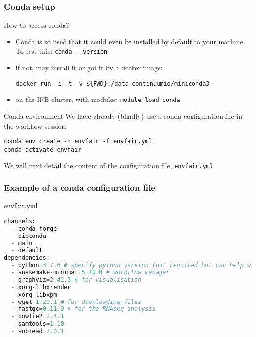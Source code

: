 \begin{frame}[containsverbatim]
\frametitle{Conda setup}
\begin{exampleblock}{How to access conda?}
\begin{itemize}
    \item Conda is so used that it could even be installed by default to your machine. To test this: \verb|conda --version|
    \item if not, may install it or got it by a docker image:
\begin{lstlisting}
docker run -i -t -v ${PWD}:/data continuumio/miniconda3
\end{lstlisting}
    \item on the IFB cluster, with modules: \verb|module load conda|
\end{itemize} 
\end{exampleblock}
\begin{exampleblock}{Conda environment}
We have already (blindly) use a conda configuration file in the workflow session:
\begin{lstlisting}
conda env create -n envfair -f envfair.yml
conda activate envfair
\end{lstlisting}
We will next detail the content of the configuration file, \verb|envfair.yml|
\end{exampleblock}
\end{frame}
\begin{frame}[containsverbatim]
\frametitle{Example of a conda configuration file}
\begin{exampleblock}{envfair.yml}
\begin{lstlisting}[language=python]
channels:
  - conda-forge
  - bioconda
  - main
  - default
dependencies:
  - python=3.7.6 # specify python version (not required but can help with downstream conflicts)
  - snakemake-minimal=5.10.0 # workflow manager
  - graphviz=2.42.3 # for visualisation
  - xorg-libxrender
  - xorg-libxpm
  - wget=1.20.1 # for downloading files
  - fastqc=0.11.9 # for the RNAseq analysis
  - bowtie2=2.4.1
  - samtools=1.10
  - subread=2.0.1
\end{lstlisting}
\end{exampleblock}
\end{frame}
